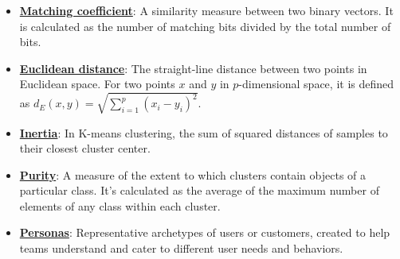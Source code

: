 \documentclass{article}%
\begin{document}
\begin{itemize}[leftmargin=*]
\item \href{https://purdue.brightspace.com/d2l/common/assets/pdfjs-d2l-dist/1.0.14-legacy/web/viewer.html?file=%2Fcontent%2Fenforced%2F1095467-wl.202510.CS.24300.001%2F12L2-distance-clusters.pdf%3Fou%3D1095467&lang=en-us&container=d2l-fileviewer-rendered-pdf&fullscreen=d2l-fileviewer-rendered-pdf-dialog&height=667#page=19}{\textbf{Matching coefficient}}: A similarity measure between two binary vectors. It is calculated as the number of matching bits divided by the total number of bits.%
\item \href{https://purdue.brightspace.com/d2l/common/assets/pdfjs-d2l-dist/1.0.14-legacy/web/viewer.html?file=%2Fcontent%2Fenforced%2F1095467-wl.202510.CS.24300.001%2F12L2-distance-clusters.pdf%3Fou%3D1095467&lang=en-us&container=d2l-fileviewer-rendered-pdf&fullscreen=d2l-fileviewer-rendered-pdf-dialog&height=667#page=17}{\textbf{Euclidean distance}}: The straight-line distance between two points in Euclidean space. For two points $x$ and $y$ in $p$-dimensional space, it is defined as $d_E(x, y) = \sqrt{\sum_{i=1}^p (x_i - y_i)^2}$.%
\item \href{https://purdue.brightspace.com/d2l/common/assets/pdfjs-d2l-dist/1.0.14-legacy/web/viewer.html?file=%2Fcontent%2Fenforced%2F1095467-wl.202510.CS.24300.001%2F12L2-distance-clusters.pdf%3Fou%3D1095467&lang=en-us&container=d2l-fileviewer-rendered-pdf&fullscreen=d2l-fileviewer-rendered-pdf-dialog&height=667#page=33}{\textbf{Inertia}}: In K-means clustering, the sum of squared distances of samples to their closest cluster center.%
\item \href{https://purdue.brightspace.com/d2l/common/assets/pdfjs-d2l-dist/1.0.14-legacy/web/viewer.html?file=%2Fcontent%2Fenforced%2F1095467-wl.202510.CS.24300.001%2F12L2-distance-clusters.pdf%3Fou%3D1095467&lang=en-us&container=d2l-fileviewer-rendered-pdf&fullscreen=d2l-fileviewer-rendered-pdf-dialog&height=667#page=44}{\textbf{Purity}}: A measure of the extent to which clusters contain objects of a particular class. It's calculated as the average of the maximum number of elements of any class within each cluster.%
\item \href{https://purdue.brightspace.com/d2l/common/assets/pdfjs-d2l-dist/1.0.14-legacy/web/viewer.html?file=%2Fcontent%2Fenforced%2F1095467-wl.202510.CS.24300.001%2F12L2-distance-clusters.pdf%3Fou%3D1095467&lang=en-us&container=d2l-fileviewer-rendered-pdf&fullscreen=d2l-fileviewer-rendered-pdf-dialog&height=667#page=11}{\textbf{Personas}}: Representative archetypes of users or customers, created to help teams understand and cater to different user needs and behaviors.%
\end{itemize}%
\end{document}
